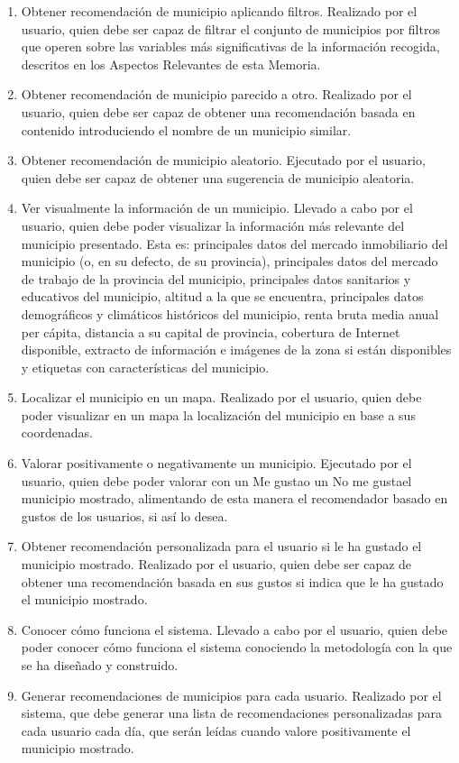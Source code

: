 \begin{enumerate}
    \item Obtener recomendación de municipio aplicando filtros. Realizado por el usuario, quien debe ser capaz de filtrar el conjunto de municipios por filtros que operen sobre las variables más significativas de la información recogida, descritos en los Aspectos Relevantes de esta Memoria.
    \item Obtener recomendación de municipio parecido a otro. Realizado por el usuario, quien debe ser capaz de obtener una recomendación basada en contenido introduciendo el nombre de un municipio similar.
    \item Obtener recomendación de municipio aleatorio. Ejecutado por el usuario, quien debe ser capaz de obtener una sugerencia de municipio aleatoria.
    \item Ver visualmente la información de un municipio. Llevado a cabo por el usuario, quien debe poder visualizar la información más relevante del municipio presentado. Esta es: principales datos del mercado inmobiliario del municipio (o, en su defecto, de su provincia), principales datos del mercado de trabajo de la provincia del municipio, principales datos sanitarios y educativos del municipio, altitud a la que se encuentra, principales datos demográficos y climáticos históricos del municipio, renta bruta media anual per cápita, distancia a su capital de provincia, cobertura de Internet disponible, extracto de información e imágenes de la zona si están disponibles y etiquetas con características del municipio.
    \item Localizar el municipio en un mapa. Realizado por el usuario, quien debe poder visualizar en un mapa la localización del municipio en base a sus coordenadas.
    \item Valorar positivamente o negativamente un municipio. Ejecutado por el usuario, quien debe poder valorar con un \guillemotleft Me gusta\guillemotright\space o un \guillemotleft No me gusta\guillemotright\space el municipio mostrado, alimentando de esta manera el recomendador basado en gustos de los usuarios, si así lo desea.
    \item Obtener recomendación personalizada para el usuario si le ha gustado el municipio mostrado. Realizado por el usuario, quien debe ser capaz de obtener una recomendación basada en sus gustos si indica que le ha gustado el municipio mostrado.
    \item Conocer cómo funciona el sistema. Llevado a cabo por el usuario, quien debe poder conocer cómo funciona el sistema conociendo la metodología con la que se ha diseñado y construido.
    \item Generar recomendaciones de municipios para cada usuario. Realizado por el sistema, que debe generar una lista de recomendaciones personalizadas para cada usuario cada día, que serán leídas cuando valore positivamente el municipio mostrado.
\end{enumerate}

